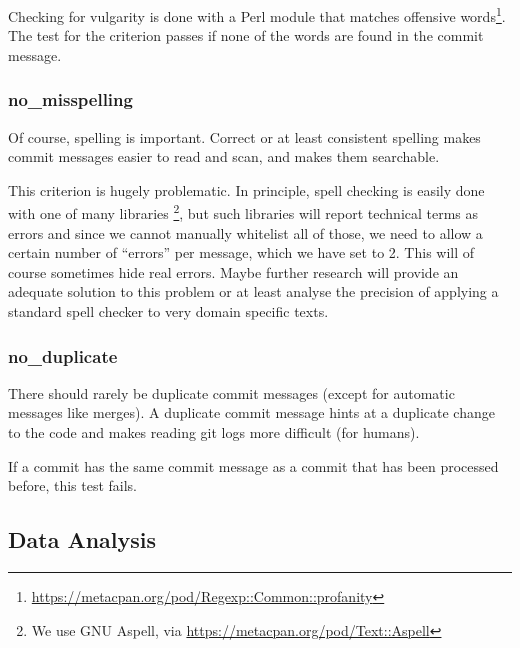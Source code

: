 Checking for vulgarity is done with a Perl module that matches offensive words\footnote{\url{https://metacpan.org/pod/Regexp::Common::profanity}}. The test for the criterion passes if none of the words are found in the commit message.

\subsubsection{no\_misspelling}
\label{subs:no_misspelling}
Of course, spelling is important. Correct or at least consistent spelling makes commit messages easier to read and scan, and makes them searchable.

This criterion is hugely problematic. In principle, spell checking is easily done with one of many libraries \footnote{We use GNU Aspell, via \url{https://metacpan.org/pod/Text::Aspell}}, but such libraries will report technical terms as errors and since we cannot manually whitelist all of those, we need to allow a certain number of ``errors'' per message, which we have set to 2. This will of course sometimes hide real errors. Maybe further research will provide an adequate solution to this problem or at least analyse the precision of applying a standard spell checker to very domain specific texts.

\subsubsection{no\_duplicate}
\label{subs:no_duplicate}
There should rarely be duplicate commit messages (except for automatic messages like merges). A duplicate commit message hints at a duplicate change to the code and makes reading git logs more difficult (for humans).

If a commit has the same commit message as a commit that has been processed before, this test fails.


\subsection{Data Analysis}
\label{sec:data-analysis}

%
%
%
%
%
%

